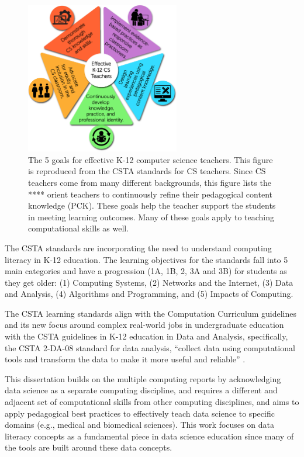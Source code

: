 \documentclass[010-intro.tex]{subfiles}
\begin{document}
    \begin{figure}[htb]
        \centering
        \includegraphics[width=0.6\textwidth]{figs/050-intro/CSTA-Standards-for-CS-Teachers---Main-Graphic.png}
        \caption[CSTA Standards for CS Teachers]{
            The 5 goals for effective K-12 computer science teachers.
            This figure is reproduced from the CSTA standards for CS teachers.
            Since CS teachers come from many different backgrounds,
            this figure lists the **** orient teachers to continuously refine their pedagogical content knowledge (PCK).
            These goals help the teacher support the students in meeting learning outcomes.
            Many of these goals apply to teaching computational skills as well.
        }
        \label{fig:csta-teaching-standards}
    \end{figure}

    The CSTA standards are incorporating the need to understand computing literacy in K-12 education.
    The learning objectives for the standards fall into 5 main categories and have a progression (1A, 1B, 2, 3A and 3B)
    for students as they get older:
    (1) Computing Systems,
    (2) Networks and the Internet,
    (3) Data and Analysis,
    (4) Algorithms and Programming, and
    (5) Impacts of Computing.

    The CSTA learning standards align with the Computation Curriculum guidelines
    and its new focus around complex real-world jobs in undergraduate education with
    the CSTA guidelines in K-12 education in Data and Analysis,
    specifically,
    the CSTA 2-DA-08 standard for data analysis,
    ``collect data using computational tools and transform the data to make it more useful and reliable''
    \cite{csta, csta2017, cc2020}.

    This dissertation builds on the multiple computing reports by acknowledging data science as a separate computing discipline,
    and requires a different and adjacent set of computational skills
    from other computing disciplines,
    and aims to apply pedagogical best practices to effectively teach data science to specific domains (e.g., medical and biomedical sciences).
    This work focuses on data literacy concepts as a fundamental piece in data science
    education since many of the tools are built around these data concepts.
\end{document}
